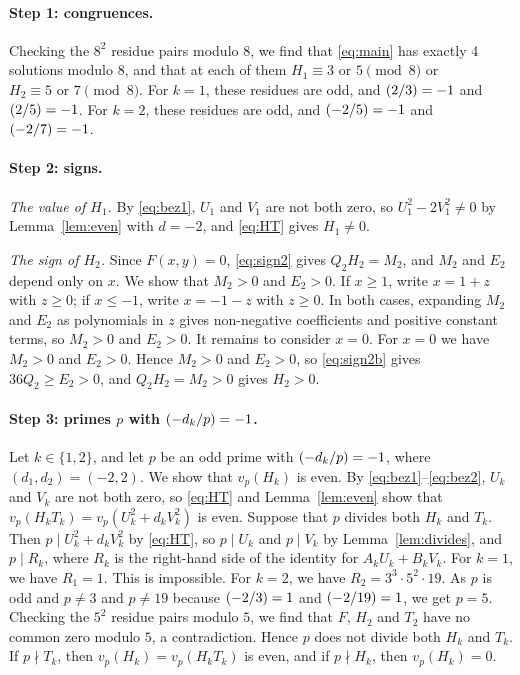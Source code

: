\documentclass[11pt]{article}
\newcommand{\leg}[2]{\mathchoice{\biggl(\dfrac{#1}{#2}\biggr)}{(#1/#2)}{(#1/#2)}{(#1/#2)}}
\begin{document}
\paragraph{Step 1: congruences.} Checking the $8^2$ residue pairs modulo $8$, we find that \eqref{eq:main} has exactly 4 solutions modulo $8$, and that at each of them $H_{1}\equiv3\text{ or }5\pmod{8}$ or $H_{2}\equiv5\text{ or }7\pmod{8}$. For $k=1$, these residues are odd, and $\leg{2}{3}=-1$ and $\leg{2}{5}=-1$. For $k=2$, these residues are odd, and $\leg{-2}{5}=-1$ and $\leg{-2}{7}=-1$.

\paragraph{Step 2: signs.} \emph{The value of $H_{1}$.} By \eqref{eq:bez1}, $U_{1}$ and $V_{1}$ are not both zero, so $U_{1}^2-2V_{1}^2\neq0$ by Lemma~\ref{lem:even} with $d=-2$, and \eqref{eq:HT} gives $H_{1}\neq0$.

\emph{The sign of $H_{2}$.} Since $F(x,y)=0$, \eqref{eq:sign2} gives $Q_{2}H_{2}=M_{2}$, and $M_{2}$ and $E_{2}$ depend only on $x$. We show that $M_{2}>0$ and $E_{2}>0$. If $x\geq1$, write $x=1+z$ with $z\geq0$; if $x\leq-1$, write $x=-1-z$ with $z\geq0$. In both cases, expanding $M_{2}$ and $E_{2}$ as polynomials in $z$ gives non-negative coefficients and positive constant terms, so $M_{2}>0$ and $E_{2}>0$. It remains to consider $x=0$. For $x=0$ we have $M_{2}>0$ and $E_{2}>0$. Hence $M_{2}>0$ and $E_{2}>0$, so \eqref{eq:sign2b} gives $36Q_{2}\geq E_{2}>0$, and $Q_{2}H_{2}=M_{2}>0$ gives $H_{2}>0$.

\paragraph{Step 3: primes $p$ with $\leg{-d_k}{p}=-1$.} Let $k\in\{1,2\}$, and let $p$ be an odd prime with $\leg{-d_k}{p}=-1$, where $(d_{1},d_{2})=(-2,2)$. We show that $v_p(H_k)$ is even. By \eqref{eq:bez1}--\eqref{eq:bez2}, $U_k$ and $V_k$ are not both zero, so \eqref{eq:HT} and Lemma~\ref{lem:even} show that $v_p(H_kT_k)=v_p(U_k^2+d_kV_k^2)$ is even. Suppose that $p$ divides both $H_k$ and $T_k$. Then $p\mid U_k^2+d_kV_k^2$ by \eqref{eq:HT}, so $p\mid U_k$ and $p\mid V_k$ by Lemma~\ref{lem:divides}, and $p\mid R_k$, where $R_k$ is the right-hand side of the identity for $A_kU_k+B_kV_k$. For $k=1$, we have $R_{1}=1$. This is impossible. For $k=2$, we have $R_{2}=3^{3}\cdot 5^{2}\cdot 19$. As $p$ is odd and $p\neq3$ and $p\neq19$ because $\leg{-2}{3}=1$ and $\leg{-2}{19}=1$, we get $p=5$. Checking the $5^2$ residue pairs modulo $5$, we find that $F$, $H_{2}$ and $T_{2}$ have no common zero modulo $5$, a contradiction. Hence $p$ does not divide both $H_k$ and $T_k$. If $p\nmid T_k$, then $v_p(H_k)=v_p(H_kT_k)$ is even, and if $p\nmid H_k$, then $v_p(H_k)=0$.
\end{document}
